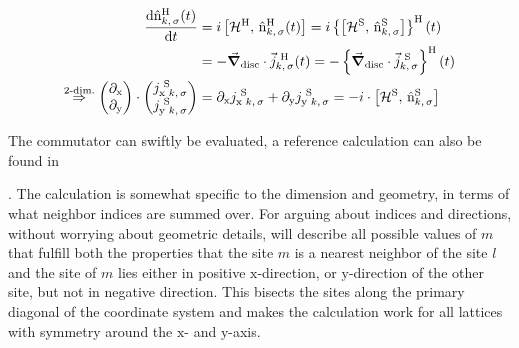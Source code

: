 \begin{equation}
    \label{eq:continuity-equation}
    \begin{split}
        \difft{\nopOfT[\heisenbergPicture]{k}{\sigma}} &= 
        i \left[\pictureHamiltonian[\heisenbergPicture],\, \nopOfT[\heisenbergPicture]{k}{\sigma}\right] = 
        i \heisenbergTimeEvolution{
            \left[\pictureHamiltonian[\schroedingerPicture],\, \nop[\schroedingerPicture]{k}{\sigma}\right]
        }\\ 
        &= - \discreteGradient \cdot \currentvecOft[\heisenbergPicture]{k}{\sigma}
         = - \heisenbergTimeEvolution{\discreteGradient \cdot \currentvec[\schroedingerPicture]{k}{\sigma} } \\
        \stackrel{\text{2-dim.}}{\Rightarrow}
        \left(\begin{matrix}
            \partial_\text{x}\\
            \partial_\text{y}\\
        \end{matrix}\right) \cdot 
        \left(\begin{matrix}
            j_{\text{x}\,\,k,\,\sigma}^{\,\,\schroedingerPicture}\\
            j_{\text{y}\,\,k,\,\sigma}^{\,\,\schroedingerPicture}
        \end{matrix}\right) &=
        \partial_\text{x}
        j_{\text{x}\,\,k,\,\sigma}^{\,\,\schroedingerPicture}+
        \partial_\text{y} 
        j_{\text{y}\,\,k,\,\sigma}^{\,\,\schroedingerPicture}
         = - i \cdot \left[\pictureHamiltonian[\schroedingerPicture],\, \nop[\schroedingerPicture]{k}{\sigma}\right]
    \end{split}
\end{equation}

The commutator can swiftly be evaluated, a reference calculation can also be found in 

. The calculation is somewhat specific to the dimension and geometry, in terms of what neighbor indices are summed over.
For arguing about indices and directions, without worrying about geometric details,  will describe all possible values of $m$ that fulfill both the properties that the site $m$ is a nearest neighbor of the site $l$ and the site of $m$ lies either in positive $\text{x}$-direction, or $\text{y}$-direction of the other site, but not in negative direction.
This bisects the sites along the primary diagonal of the coordinate system and makes the calculation work for all lattices with symmetry around the $\text{x}$- and $\text{y}$-axis.

